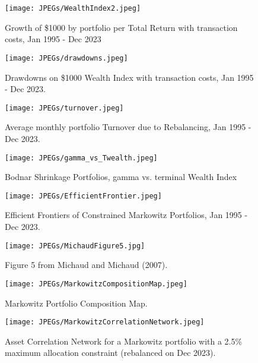\documentclass[12pt,letterpaper]{article}
\begin{document}
\begin{figure}
\centering
\texttt{[image: JPEGs/WealthIndex2.jpeg]}
\caption{\label{fig:TotRetWeatlhIndexWithTransactionCosts}Growth of \$1000 by portfolio per Total Return with transaction costs, Jan 1995 - Dec 2023}
\end{figure}
\clearpage


\begin{figure}
\centering
\texttt{[image: JPEGs/drawdowns.jpeg]}
\caption{\label{fig:drawdowns}Drawdowns on \$1000 Wealth Index with transaction costs, Jan 1995 - Dec 2023.}
\end{figure}

\begin{figure}
\centering
\texttt{[image: JPEGs/turnover.jpeg]}
\caption{\label{fig:turnover}Average monthly portfolio Turnover due to Rebalancing, Jan 1995 - Dec 2023.}
\end{figure}
\clearpage

\begin{figure}
\centering
\texttt{[image: JPEGs/gamma\_vs\_Twealth.jpeg]}
\caption{\label{fig:gamma_vs_Twealth}Bodnar Shrinkage Portfolios, gamma vs. terminal Wealth Index}
\end{figure}
\clearpage

\begin{figure}
\centering
\texttt{[image: JPEGs/EfficientFrontier.jpeg]}
\caption{\label{fig:MarkowitzFrontiers}Efficient Frontiers of Constrained Markowitz Portfolios, Jan 1995 - Dec 2023.}
\end{figure}

\begin{figure}
\centering
\texttt{[image: JPEGs/MichaudFigure5.jpg]}
\caption{\label{fig:MichaudFigure5} Figure 5 from Michaud and Michaud (2007).}
\end{figure}
\clearpage

\begin{figure}
\centering
\texttt{[image: JPEGs/MarkowitzCompositionMap.jpeg]}
\caption{\label{fig:MarkowitzCompositionMap} Markowitz Portfolio Composition Map.}
\end{figure}
\clearpage

\begin{figure}
\centering
\texttt{[image: JPEGs/MarkowitzCorrelationNetwork.jpeg]}
\caption{\label{fig:MarkowitzCorrelationNetwork} Asset Correlation Network for a Markowitz portfolio with a 2.5\% maximum allocation constraint (rebalanced on Dec 2023).}
\end{figure}
\clearpage
\end{document}
